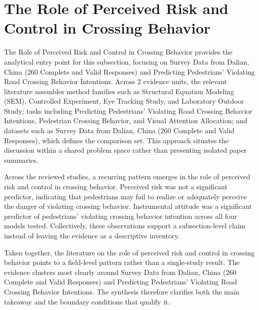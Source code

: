 \documentclass{article}
\begin{document}
\section{The Role of Perceived Risk and Control in Crossing Behavior}
The Role of Perceived Risk and Control in Crossing Behavior provides the analytical entry point for this subsection, focusing on Survey Data from Dalian, China (260 Complete and Valid Responses) and Predicting Pedestrians' Violating Road Crossing Behavior Intentions. Across 2 evidence units, the relevant literature assembles method families such as Structural Equation Modeling (SEM), Controlled Experiment, Eye Tracking Study, and Laboratory Outdoor Study; tasks including Predicting Pedestrians' Violating Road Crossing Behavior Intentions, Pedestrian Crossing Behavior, and Visual Attention Allocation; and datasets such as Survey Data from Dalian, China (260 Complete and Valid Responses), which defines the comparison set. This approach situates the discussion within a shared problem space rather than presenting isolated paper summaries. \cite{08_2016_zhou_aap,09_2018_jiang_aap}

Across the reviewed studies, a recurring pattern emerges in the role of perceived risk and control in crossing behavior. Perceived risk was not a significant predictor, indicating that pedestrians may fail to realize or adequately perceive the danger of violating crossing behavior. Instrumental attitude was a significant predictor of pedestrians' violating crossing behavior intention across all four models tested. Collectively, these observations support a subsection-level claim instead of leaving the evidence as a descriptive inventory. \cite{08_2016_zhou_aap,09_2018_jiang_aap}

Taken together, the literature on the role of perceived risk and control in crossing behavior points to a field-level pattern rather than a single-study result. The evidence clusters most clearly around Survey Data from Dalian, China (260 Complete and Valid Responses) and Predicting Pedestrians' Violating Road Crossing Behavior Intentions. The synthesis therefore clarifies both the main takeaway and the boundary conditions that qualify it. \cite{08_2016_zhou_aap,09_2018_jiang_aap}
\end{document}
